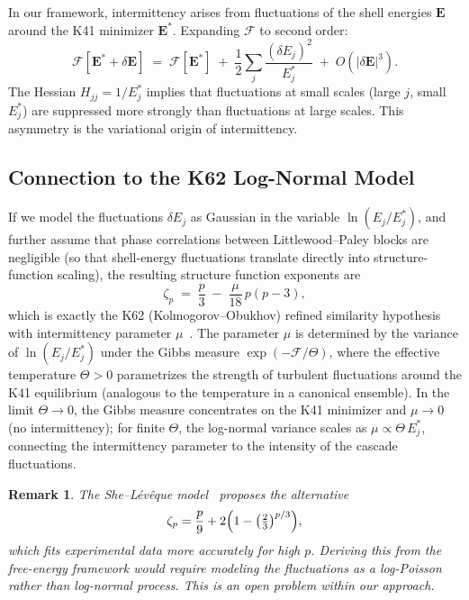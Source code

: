 \documentclass[12pt,a4paper]{article}
\theoremstyle{breakdef}
\theoremstyle{breakplain}
\theoremstyle{breakdef}
\newtheorem{remark}[definition]{Remark}
\begin{document}
In our framework, intermittency arises from fluctuations of the shell
energies $\mathbf{E}$ around the K41 minimizer $\mathbf{E}^*$.  Expanding
$\mathcal{F}$ to second order:
\begin{equation}\label{eq:F_expand}
  \mathcal{F}[\mathbf{E}^* + \delta\mathbf{E}]
  \;=\;
  \mathcal{F}[\mathbf{E}^*]
  \;+\;
  \frac{1}{2}\sum_{j}
    \frac{(\delta E_j)^2}{E_j^*}
  \;+\; O(|\delta\mathbf{E}|^3).
\end{equation}
The Hessian $H_{jj} = 1/E_j^*$ implies that fluctuations at small scales
(large $j$, small $E_j^*$) are suppressed more strongly than fluctuations
at large scales.  This asymmetry is the variational origin of
intermittency.

\subsection{Connection to the K62 Log-Normal Model}

If we model the fluctuations $\delta E_j$ as Gaussian in the variable
$\ln(E_j/E_j^*)$, and further assume that phase correlations between
Littlewood--Paley blocks are negligible (so that shell-energy
fluctuations translate directly into structure-function scaling), the
resulting structure function exponents are
\begin{equation}\label{eq:zeta_p}
  \zeta_p
  \;=\;
  \frac{p}{3}
  \;-\;
  \frac{\mu}{18}\,p(p-3),
\end{equation}
which is exactly the K62 (Kolmogorov--Obukhov) refined similarity
hypothesis with intermittency parameter $\mu$~\cite{K62,Frisch95}.  The
parameter $\mu$ is determined by the variance of $\ln(E_j/E_j^*)$ under
the Gibbs measure $\exp(-\mathcal{F}/\Theta)$, where the effective
temperature $\Theta > 0$ parametrizes the strength of turbulent
fluctuations around the K41 equilibrium (analogous to the temperature
in a canonical ensemble).  In the limit $\Theta \to 0$, the Gibbs
measure concentrates on the K41 minimizer and $\mu \to 0$ (no
intermittency); for finite $\Theta$, the log-normal variance scales as
$\mu \propto \Theta\,E_j^*$, connecting the intermittency parameter
to the intensity of the cascade fluctuations.

\begin{remark}
The She--Lévêque model~\cite{SL94} proposes the alternative
\[
  \zeta_p = \frac{p}{9} + 2\Bigl(1 - \bigl(\tfrac{2}{3}\bigr)^{p/3}\Bigr),
\]
which fits experimental data more accurately for high $p$.  Deriving this
from the free-energy framework would require modeling the fluctuations as
a log-Poisson rather than log-normal process.  This is an open problem
within our approach.
\end{remark}
\end{document}
